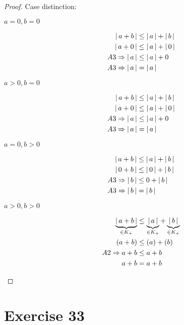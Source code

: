 \documentclass[a4paper]{article}
\theoremstyle{definition}
\newcommand\abs[1]{\left|\thinspace #1\thinspace\right|}
\begin{document}
\begin{proof}
  Case distinction:
  \begin{description}
    \item[$a = 0, b = 0$]
      \begin{align*}
        \abs{a + b} &\leq \abs{a} + \abs{b} \\
        \abs{a + 0} &\leq \abs{a} + \abs{0} \\
        A3 \Rightarrow \abs{a} &\leq \abs{a} + 0 \\
        A3 \Rightarrow \abs{a} &= \abs{a} \\
      \end{align*}
    \item[$a > 0, b = 0$]
      \begin{align*}
        \abs{a + b} &\leq \abs{a} + \abs{b} \\
        \abs{a + 0} &\leq \abs{a} + \abs{0} \\
        A3 \Rightarrow \abs{a} &\leq \abs{a} + 0 \\
        A3 \Rightarrow \abs{a} &= \abs{a} \\
      \end{align*}
    \item[$a = 0, b > 0$]
      \begin{align*}
        \abs{a + b} &\leq \abs{a} + \abs{b} \\
        \abs{0 + b} &\leq \abs{0} + \abs{b} \\
        A3 \Rightarrow \abs{b} &\leq 0 + \abs{b} \\
        A3 \Rightarrow \abs{b} &= \abs{b} \\
      \end{align*}
    \item[$a > 0, b > 0$]
      \begin{align*}
        \underbrace{\abs{a + b}}_{\in K_+} &\leq \underbrace{\abs{a}}_{\in K_+} + \underbrace{\abs{b}}_{\in K_+} \\
        (a + b) &\leq (a) + (b) \\
        A2 \Rightarrow a + b &\leq a + b \\
        a + b &= a + b \\
      \end{align*}
  \end{description}
\end{proof}

\section{Exercise 33}
\end{document}
